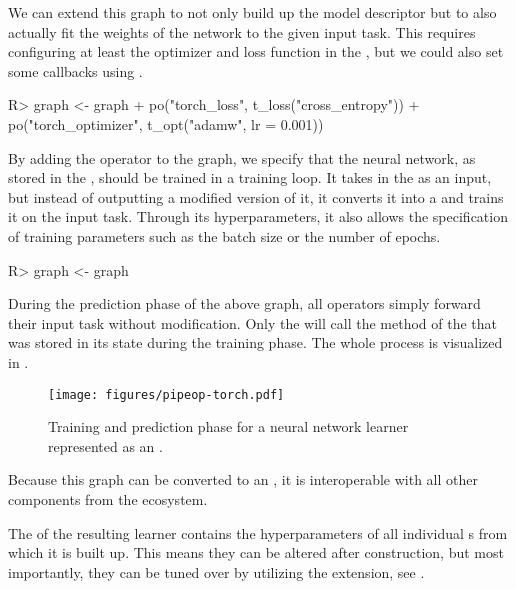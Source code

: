 \documentclass[article]{jss}
\theoremstyle{definition}
\begin{document}
We can extend this graph to not only build up the model descriptor but to also actually fit the weights of the network to the given input task.
This requires configuring at least the optimizer and loss function in the , but we could also set some callbacks using .

\begin{CodeInput}
R> graph <- graph %
+    po("torch_loss", t_loss("cross_entropy")) %
+    po("torch_optimizer", t_opt("adamw", lr = 0.001))
\end{CodeInput}

By adding the  operator to the graph, we specify that the neural network, as stored in the , should be trained in a training loop.
It takes in the  as an input, but instead of outputting a modified version of it, it converts it into a  and trains it on the input task.
Through its hyperparameters, it also allows the specification of training parameters such as the batch size or the number of epochs.

\begin{CodeInput}
R> graph <- graph %
\end{CodeInput}

During the prediction phase of the above graph, all  operators simply forward their input task without modification.
Only the  will call the  method of the  that was stored in its state during the training phase.
The whole process is visualized in .

\begin{figure}
    \centering
    \texttt{[image: figures/pipeop-torch.pdf]}
    \caption{Training and prediction phase for a neural network learner represented as an .}
    \label{fig:pipeop-torch}
\end{figure}

Because this graph can be converted to an , it is interoperable with all other components from the  ecosystem.


The  of the resulting learner contains the hyperparameters of all individual s from which it is built up.
This means they can be altered after construction, but most importantly, they can be tuned over by utilizing the  extension, see .
\end{document}
